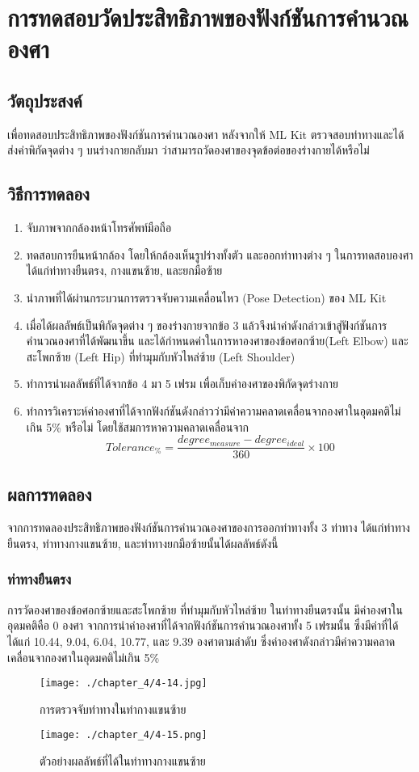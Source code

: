 \section{การทดสอบวัดประสิทธิภาพของฟังก์ชันการคำนวณองศา}
\tocless\subsection{วัตถุประสงค์}
เพื่อทดสอบประสิทธิภาพของฟังก์ชันการคำนวณองศา หลังจากให้ ML Kit ตรวจสอบท่าทางและได้ส่งค่าพิกัดจุดต่าง ๆ บนร่างกายกลับมา ว่าสามารถวัดองศาของจุดข้อต่อของร่างกายได้หรือไม่
\tocless\subsection{วิธีการทดลอง}
\begin{enumerate}
	\item จับภาพจากกล้องหน้าโทรศัพท์มือถือ
	\item ทดสอบการยืนหน้ากล้อง โดยให้กล้องเห็นรูปร่างทั้งตัว และออกท่าทางต่าง ๆ ในการทดสอบองศา ได้แก่ท่าทางยืนตรง, กางแขนซ้าย, และยกมือซ้าย
	\item นำภาพที่ได้ผ่านกระบวนการตรวจจับความเคลื่อนไหว (Pose Detection) ของ ML Kit
	\item เมื่อได้ผลลัพธ์เป็นพิกัดจุดต่าง ๆ ของร่างกายจากข้อ 3 แล้วจึงนำค่าดังกล่าวเข้าสู่ฟังก์ชันการคำนวณองศาที่ได้พัฒนาขึ้น และได้กำหนดค่าในการหาองศาของข้อศอกซ้าย(Left Elbow) และสะโพกซ้าย (Left Hip) ที่ทำมุมกับหัวไหล่ซ้าย (Left Shoulder)
	\item ทำการนำผลลัพธ์ที่ได้จากข้อ 4 มา 5 เฟรม เพื่อเก็บค่าองศาของพิกัดจุดร่างกาย
	\item ทำการวิเคราะห์ค่าองศาที่ได้จากฟังก์ชันดังกล่าวว่ามีค่าความคลาดเคลื่อนจากองศาในอุดมคติไม่เกิน 5\% หรือไม่ โดยใช้สมการหาความคลาดเคลื่อนจาก
	      \begin{equation}
		      Tolerance_\%=\frac{degree_{measure} - degree_{ideal}}{360} \times 100
	      \end{equation}
\end{enumerate}
\tocless\subsection{ผลการทดลอง}
จากการทดลองประสิทธิภาพของฟังก์ชันการคำนวณองศาของการออกท่าทางทั้ง 3 ท่าทาง ได้แก่ท่าทางยืนตรง, ท่าทางกางแขนซ้าย, และท่าทางยกมือซ้ายนั้นได้ผลลัพธ์ดังนี้
\subsubsection{ท่าทางยืนตรง}
การวัดองศาของข้อศอกซ้ายและสะโพกซ้าย ที่ทำมุมกับหัวไหล่ซ้าย ในท่าทางยืนตรงนั้น มีค่าองศาในอุดมคติคือ 0 องศา จากการนำค่าองศาที่ได้จากฟังก์ชันการคำนวณองศาทั้ง 5 เฟรมนั้น ซึ่งมีค่าที่ได้ ได้แก่ 10.44, 9.04, 6.04, 10.77, และ 9.39 องศาตามลำดับ ซึ่งค่าองศาดังกล่าวมีค่าความคลาดเคลื่อนจากองศาในอุดมคติไม่เกิน 5\%
\begin{figure}
	\texttt{[image: ./chapter\_4/4-14.jpg]}
	\caption{การตรวจจับท่าทางในท่ากางแขนซ้าย}
\end{figure}
\begin{figure}
	\texttt{[image: ./chapter\_4/4-15.png]}
	\caption{ตัวอย่างผลลัพธ์ที่ได้ในท่าทางกางแขนซ้าย}
\end{figure}
